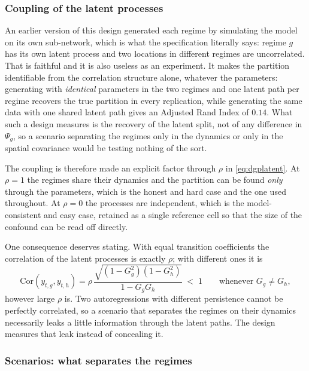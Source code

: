 \subsubsection{Coupling of the latent processes}\label{sec3:coupling}

An earlier version of this design generated each regime by simulating the model on its own sub-network, which is what the specification literally says: regime $g$ has its own latent process and two locations in different regimes are uncorrelated. That is faithful and it is also useless as an experiment. It makes the partition identifiable from the correlation structure alone, whatever the parameters: generating with \emph{identical} parameters in the two regimes and one latent path per regime recovers the true partition in every replication, while generating the same data with one shared latent path gives an Adjusted Rand Index of $0.14$. What such a design measures is the recovery of the latent split, not of any difference in $\Psi_g$, so a scenario separating the regimes only in the dynamics or only in the spatial covariance would be testing nothing of the sort.

The coupling is therefore made an explicit factor through $\rho$ in \eqref{eq:dgplatent}. At $\rho = 1$ the regimes share their dynamics and the partition can be found \emph{only} through the parameters, which is the honest and hard case and the one used throughout. At $\rho = 0$ the processes are independent, which is the model-consistent and easy case, retained as a single reference cell so that the size of the confound can be read off directly.

One consequence deserves stating. With equal transition coefficients the correlation of the latent processes is exactly $\rho$; with different ones it is
\begin{equation}
  \mathrm{Cor}(y_{t,g}, y_{t,h}) =
  \rho\,\frac{\sqrt{(1-G_g^2)(1-G_h^2)}}{1 - G_g G_h} \;<\; 1
  \qquad \text{whenever } G_g \neq G_h ,
  \label{eq:leak}
\end{equation}
however large $\rho$ is. Two autoregressions with different persistence cannot be perfectly correlated, so a scenario that separates the regimes on their dynamics necessarily leaks a little information through the latent paths. The design measures that leak instead of concealing it.

\subsubsection{Scenarios: what separates the regimes}\label{sec3:scenarios}

